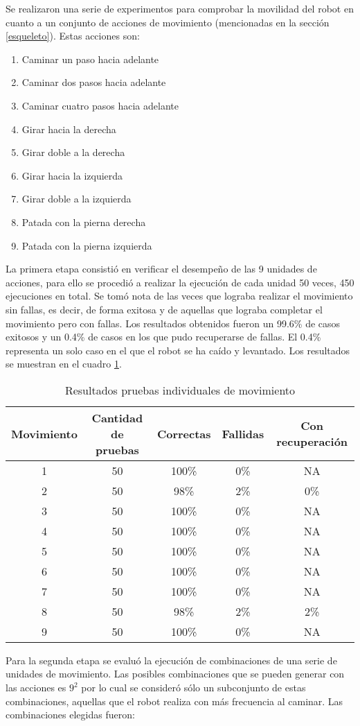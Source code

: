 Se realizaron una serie de experimentos para comprobar la movilidad del robot en cuanto a un conjunto de acciones de movimiento (mencionadas en la sección \ref{esqueleto}). Estas acciones son:
\begin{enumerate}

\setlength{\itemsep}{0.5pt}
\item Caminar un paso hacia adelante 
\item Caminar dos pasos hacia adelante 
\item Caminar cuatro pasos hacia adelante 
\item Girar hacia la derecha 
\item Girar doble a la derecha 
\item Girar hacia la izquierda 
\item Girar doble a la izquierda
\item Patada con la pierna derecha 
\item Patada con la pierna izquierda

\end{enumerate}
La primera etapa consistió en verificar el desempeño de las 9 unidades de acciones, para ello se procedió a realizar la ejecución de cada unidad 50 veces, 450 ejecuciones en total. Se tomó nota de las veces que lograba realizar el movimiento sin fallas, es decir, de forma exitosa y de aquellas que lograba completar el movimiento pero con fallas. Los resultados obtenidos fueron un 99.6\% de casos exitosos y un 0.4\% de casos en los que pudo recuperarse de fallas. El 0.4\% representa un solo caso en el que el robot se ha caído y levantado. Los resultados se muestran en el cuadro \ref{fig:individuales}.  

\begin{table}
\centering
\begin{tabular}{|c|c|c|c|c|}
\hline 
Movimiento & Cantidad de pruebas & Correctas & Fallidas & Con recuperaci\'on \\ 
\hline 
1 & 50 & 100\% & 0\% & NA \\ 
\hline 
2 & 50 & 98\% & 2\% & 0\% \\ 
\hline 
3 & 50 &  100\% & 0\% & NA \\ 
\hline 
4 & 50 &  100\% & 0\% & NA \\ 
\hline 
5 & 50 &  100\% & 0\% & NA \\ 
\hline 
6 & 50 &  100\% & 0\% & NA \\ 
\hline 
7 & 50 &  100\% & 0\% & NA \\ 
\hline 
8 & 50 &   98\% & 2\% & 2\% \\ 
\hline 
9 & 50 &  100\% & 0\% & NA \\ 
\hline 
\end{tabular} 
\caption{Resultados pruebas individuales de movimiento}
\label{fig:individuales}
\end{table}
Para la segunda etapa se evalu\'o la ejecuci\'on de combinaciones de una serie de unidades de movimiento. Las posibles combinaciones que se pueden generar con las acciones es $9 ^ 2$ por lo cual se consideró s\'olo un subconjunto de estas combinaciones, aquellas que el robot realiza con más frecuencia al caminar. Las combinaciones elegidas fueron: 

